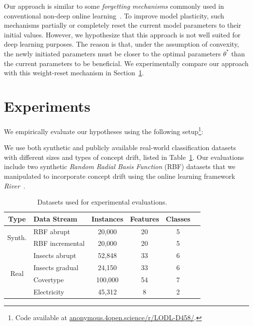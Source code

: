 \documentclass[runningheads]{llncs}
\begin{document}
Our approach is similar to some \textit{forgetting mechanisms} commonly used in conventional non-deep online learning~\cite{gamaSurveyConceptDrift2014}.
To improve model plasticity, such mechanisms partially or completely reset the current model parameters to their initial values.
However, we hypothesize that this approach is not well suited for deep learning purposes.
The reason is that, under the assumption of convexity, the newly initiated parameters must be closer to the optimal parameters $\theta^*$ than the current parameters to be beneficial.
We experimentally compare our approach with this weight-reset mechanism in Section~\ref{sec:experiments}.

\section{Experiments}\label{sec:experiments}

We empirically evaluate our hypotheses using the following setup\footnote[2]{Code available at \url{anonymous.4open.science/r/LODL-D458/}.}:

We use both synthetic and publicly available real-world classification datasets with different sizes and types of concept drift, listed in Table~\ref{tab:datasets}.
Our evaluations include two synthetic \textit{Random Radial Basis Function} (RBF) datasets that we manipulated to incorporate concept drift using the online learning framework \textit{River}~\cite{montiel2021river}.

\begin{table}[ht]
	\centering
	\scriptsize
	\caption{Datasets used for experimental evaluations.}
	\begin{tabular}{@{}clcccc@{}}
		\toprule
		Type                    & Data Stream     & Instances               & Features & Classes \\
		\midrule
		\multirow{2}{*}{Synth.} & RBF abrupt      & 20,000                  & 20       & 5       \\
		                        & RBF incremental & 20,000                  & 20       & 5       \\
		\midrule
		\multirow{5}{*}{Real}   & Insects abrupt  & 52,848                  & 33       & 6       \\
		                        & Insects gradual & 24,150                  & 33       & 6       \\
		                        & Covertype       & 100,000\footnotemark[3] & 54       & 7       \\
		                        & Electricity     & 45,312                  & 8        & 2       \\
		\bottomrule
	\end{tabular}
	\label{tab:datasets}
\end{table}
\end{document}
